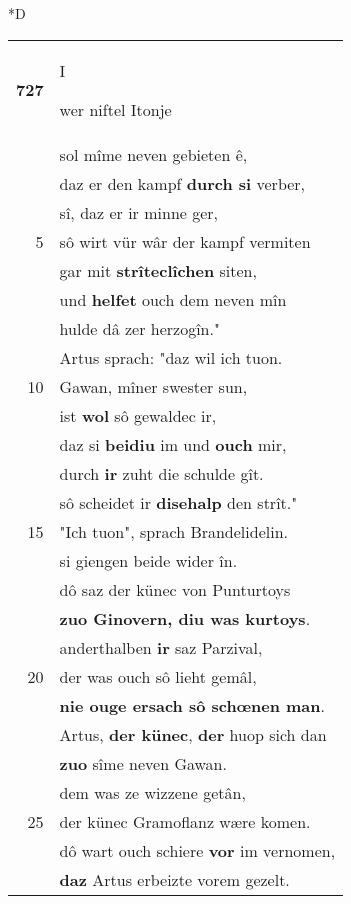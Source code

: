 \documentclass[8pt,a4paper,notitlepage]{article}
\begin{document}
\begin{table}[ht]
\begin{minipage}[t]{0.5\linewidth}
\small
\begin{center}*D
\end{center}
\begin{tabular}{rl}
\textbf{727} & \begin{large}I\end{large}wer niftel Itonje\\ 
 & sol mîme neven gebieten ê,\\ 
 & daz er den kampf \textbf{durch si} verber,\\ 
 & sî, daz er ir minne ger,\\ 
5 & sô wirt vür wâr der kampf vermiten\\ 
 & gar mit \textbf{strîteclîchen} siten,\\ 
 & und \textbf{helfet} ouch dem neven mîn\\ 
 & hulde dâ zer herzogîn."\\ 
 & Artus sprach: "daz wil ich tuon.\\ 
10 & Gawan, mîner swester sun,\\ 
 & ist \textbf{wol} sô gewaldec ir,\\ 
 & daz si \textbf{beidiu} im und \textbf{ouch} mir,\\ 
 & durch \textbf{ir} zuht die schulde gît.\\ 
 & sô scheidet ir \textbf{disehalp} den strît."\\ 
15 & "Ich tuon", sprach Brandelidelin.\\ 
 & si giengen beide wider în.\\ 
 & dô saz der künec von Punturtoys\\ 
 & \textbf{zuo Ginovern, diu was kurtoys}.\\ 
 & anderthalben \textbf{ir} saz Parzival,\\ 
20 & der was ouch sô lieht gemâl,\\ 
 & \textbf{nie ouge ersach sô schœnen man}.\\ 
 & Artus, \textbf{der künec}, \textbf{der} huop sich dan\\ 
 & \textbf{zuo} sîme neven Gawan.\\ 
 & dem was ze wizzene getân,\\ 
25 & der künec Gramoflanz wære komen.\\ 
 & dô wart ouch schiere \textbf{vor} im vernomen,\\ 
 & \textbf{daz} Artus erbeizte vorem gezelt.\\ 

\end{tabular}
\end{minipage}
\end{table}
\end{document}
